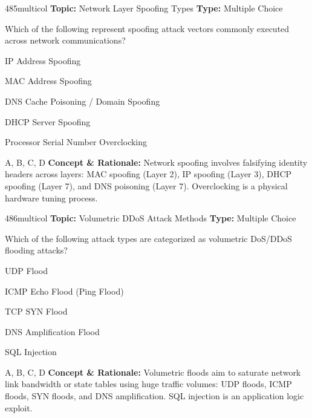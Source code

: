 \begin{qcard}{485}{multicol}
\textcolor{darkslate!75}{\small\textbf{Topic:} Network Layer Spoofing Types \hfill \textbf{Type:} Multiple Choice}\vspace{0.4em}\par
Which of the following represent spoofing attack vectors commonly executed across network communications?
\begin{qoptions}
\item IP Address Spoofing
\item MAC Address Spoofing
\item DNS Cache Poisoning / Domain Spoofing
\item DHCP Server Spoofing
\item Processor Serial Number Overclocking
\end{qoptions}
\end{qcard}
\nopagebreak
\begin{explainbox}{A, B, C, D}
\textbf{Concept \& Rationale:} Network spoofing involves falsifying identity headers across layers: MAC spoofing (Layer 2), IP spoofing (Layer 3), DHCP spoofing (Layer 7), and DNS poisoning (Layer 7). Overclocking is a physical hardware tuning process.
\end{explainbox}

\begin{qcard}{486}{multicol}
\textcolor{darkslate!75}{\small\textbf{Topic:} Volumetric DDoS Attack Methods \hfill \textbf{Type:} Multiple Choice}\vspace{0.4em}\par
Which of the following attack types are categorized as volumetric DoS/DDoS flooding attacks?
\begin{qoptions}
\item UDP Flood
\item ICMP Echo Flood (Ping Flood)
\item TCP SYN Flood
\item DNS Amplification Flood
\item SQL Injection
\end{qoptions}
\end{qcard}
\nopagebreak
\begin{explainbox}{A, B, C, D}
\textbf{Concept \& Rationale:} Volumetric floods aim to saturate network link bandwidth or state tables using huge traffic volumes: UDP floods, ICMP floods, SYN floods, and DNS amplification. SQL injection is an application logic exploit.
\end{explainbox}

